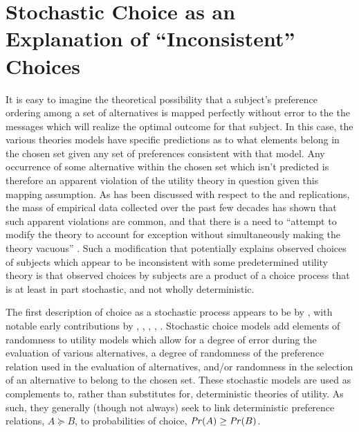 \documentclass[../main.tex]{subfiles}
\begin{document}
\section{Stochastic Choice as an Explanation of \enquote{Inconsistent} Choices}

It is easy to imagine the theoretical possibility that a subject's preference ordering among a set of alternatives is mapped perfectly without error to the the messages which will realize the optimal outcome for that subject.
In this case, the various theories models have specific predictions as to what elements belong in the chosen set given any set of preferences consistent with that model.
Any occurrence of some alternative within the chosen set which isn't predicted is therefore an apparent violation of the utility theory in question given this mapping assumption.
As has been discussed with respect to the \textcite{Grether1979} and \textcite{Holt2002} replications, the mass of empirical data collected over the past few decades has shown that such apparent violations are common, and that there is a need to \enquote{attempt to modify the theory to account for  exception without simultaneously making the theory vacuous} \textcite[634]{Grether1979}.
Such a modification that potentially explains observed choices of subjects which appear to be inconsistent with some predetermined utility theory is that observed choices by subjects are a product of a choice process that is at least in part stochastic, and not wholly deterministic.


The first description of choice as a stochastic process appears to be by \textcite{Edwards1954}, with notable early contributions by \textcite{Luce1958}, \textcite{Debreu1958}, \textcite{Davidson1959}, \textcite{Becker1963}, \textcite{Luce1965}.
Stochastic choice models add elements of randomness to utility models which allow for a degree of error during the evaluation of various alternatives, a degree of randomness of the preference relation used  in the evaluation of alternatives, and/or randomness in the selection of an alternative to belong to the chosen set.
These stochastic models are used as complements to, rather than substitutes for, deterministic theories of utility.
As such, they generally (though not always) seek to link deterministic preference relations, $A \succeq B$, to probabilities of choice, ${\mathit{Pr}}(A) \geq {\ensuremath{\mathit{Pr}}}(B)$.
\end{document}
